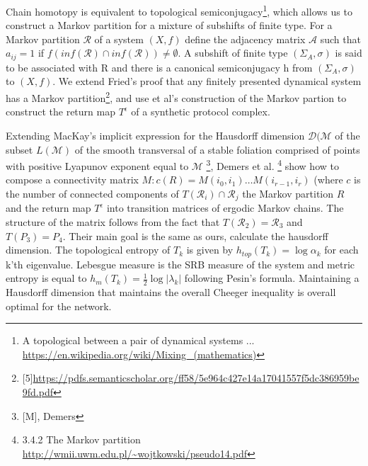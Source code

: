 \documentclass{article}
\begin{document}
Chain homotopy is equivalent to topological semiconjugacy\footnote{A topological  between a pair of dynamical systems ... \url{https://en.wikipedia.org/wiki/Mixing_(mathematics)}}, which allows us to construct a Markov partition for a mixture of subshifts of finite type. For a Markov partition $\mathcal{R}$ of a system $(X, f)$ define the adjacency matrix $\mathcal{A}$ such that $a_{ij} = 1$ if $f(inf(\mathcal{R}) \cap inf(\mathcal{R})) \neq \emptyset$. A subshift of finite type $(\Sigma_A, \sigma)$ is said to be associated with R and there is a canonical semiconjugacy h from $(\Sigma_A, \sigma)$ to $(X, f)$. We extend Fried's proof that any finitely presented dynamical system has a Markov partition\footnote{[5]\url{https://pdfs.semanticscholar.org/ff58/5e964c427e14a17041557f5dc386959be9fd.pdf}}, and use et al's construction of the Markov partion to construct the return map $T^{\epsilon}$ of a synthetic protocol complex.

Extending MacKay's implicit expression for the Hausdorff dimension $\mathcal{D}(\mathcal{M}$ of the subset $L(\mathcal{M})$ of the smooth transversal of a stable foliation comprised of points with positive Lyapunov exponent equal to $\mathcal{M}$ \footnote{[M], Demers}, Demers et al. \footnote{3.4.2 The Markov partition \url{http://wmii.uwm.edu.pl/~wojtkowski/pseudo14.pdf}} show how to compose a connectivity matrix $M: c(R) = M(i_0, i_1) \dots M(i_{r-1}, i_r)$ (where $c$ is the number of connected components of $T(\mathcal{R}_i) \cap \mathcal{R}_j $ the Markov partition $R$ and the return map 
$T^{\epsilon}$ into transition matrices of ergodic Markov chains. The structure of the matrix follows from the fact that $T(\mathcal{R}_2) = \mathcal{R}_3$ and $T(P_3) = P_4$. Their main goal is the same as ours, calculate the hausdorff dimension. The topological entropy of $T_k$ is given by $h_{top}(T_k) = \log \alpha_k$ for each k'th eigenvalue. Lebesgue measure is the SRB measure of the system and metric entropy is equal to $h_m(T_k) = \tfrac{1}{2}\log |\lambda_k|$ following Pesin’s formula. Maintaining a Hausdorff dimension that maintains the overall Cheeger inequality is overall optimal for the network.
\end{document}

